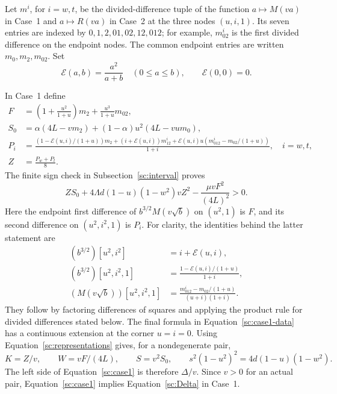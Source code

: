 Let $m^i$, for $i=w,t$, be the divided-difference tuple of the function
$a\mapsto M(va)$ in Case~1 and $a\mapsto R(va)$ in Case~2 at the
three nodes $(u,i,1)$.  Its seven entries are indexed by
$0,1,2,01,02,12,012$; for example, $m^i_{02}$ is the first divided
difference on the endpoint nodes.  The common endpoint entries are
written $m_0,m_2,m_{02}$.  Set
\[
 \mathcal E(a,b)=\frac{a^2}{a+b}\quad(0\leq a\leq b),\qquad
 \mathcal E(0,0)=0.
\]

In Case~1 define
\begin{align}
 F&=\left(1+\frac{u^2}{1+u}\right)m_2
                  +\frac{u^3}{1+u}m_{02},\nonumber\\
 S_0&=\alpha(4L-vm_2)
               +(1-\alpha)u^2(4L-vu m_0),\nonumber\\
 P_i&=\frac{(1-\mathcal E(u,i)/(1+u))m_2
            +(i+\mathcal E(u,i))m^i_{12}
            +\mathcal E(u,i)u(m^i_{012}-m_{02}/(1+u))}{1+i},
       \quad i=w,t,\label{sc:case1-data}\\
 Z&=\frac{P_w+P_t}{8}.\nonumber
\end{align}
The finite sign check in Subsection~\ref{sc:interval} proves
\begin{equation}\label{sc:case1}
 ZS_0+4\Lambda d(1-u)(1-w^2)vZ^2
                     -\frac{\mu vF^2}{(4L)^2}>0.
\end{equation}
Here the endpoint first difference of $b^{3/2}M(v\sqrt b)$ on
$(u^2,1)$ is $F$, and its second difference on $(u^2,i^2,1)$ is $P_i$.
For clarity, the identities behind the latter statement are
\begin{align*}
 (b^{3/2})[u^2,i^2]&=i+\mathcal E(u,i),\\
 (b^{3/2})[u^2,i^2,1]&=
           \frac{1-\mathcal E(u,i)/(1+u)}{1+i},\\
 (M(v\sqrt b))[u^2,i^2,1]&=
           \frac{m^i_{012}-m_{02}/(1+u)}{(u+i)(1+i)}.
\end{align*}
They follow by factoring differences of squares and applying the
product rule for divided differences stated below.  The final formula in
Equation~\eqref{sc:case1-data} has a continuous extension at the corner $u=i=0$.
Using Equation~\eqref{sc:representations} gives, for a nondegenerate pair,
\[
 K=Z/v,\qquad W=vF/(4L),\qquad S=v^2S_0,
 \qquad s^2(1-u^2)^2=4d(1-u)(1-w^2).
\]
The left side of Equation~\eqref{sc:case1} is therefore $\Delta/v$.
Since $v>0$ for an actual pair, Equation~\eqref{sc:case1} implies
Equation~\eqref{sc:Delta} in Case~1.

